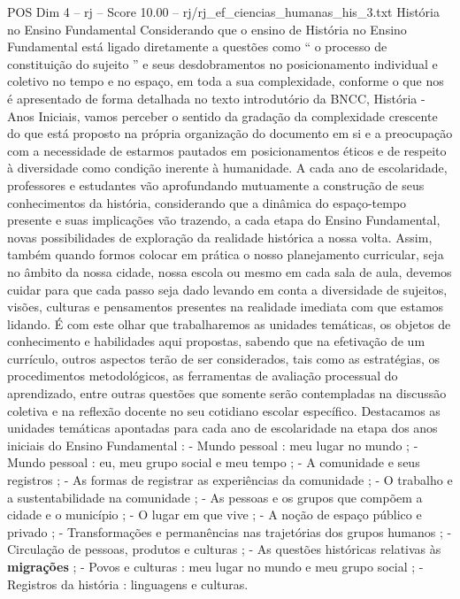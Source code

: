 \begin{textsample}{POS Dim 4 – rj – Score 10.00 – rj/rj\_ef\_ciencias\_humanas\_his\_3.txt}  \label{ex:f4_pos_162}
História no Ensino Fundamental Considerando que o ensino de História no Ensino Fundamental está ligado diretamente a questões como “ o processo de constituição do sujeito ” e seus desdobramentos no posicionamento individual e coletivo no tempo e no espaço, em toda a sua complexidade, conforme o que nos é apresentado de forma detalhada no texto introdutório da BNCC, História - Anos Iniciais, vamos perceber o sentido da gradação da complexidade crescente do que está proposto na própria organização do documento em si e a preocupação com a necessidade de estarmos pautados em posicionamentos éticos e de respeito à diversidade como condição inerente à humanidade.
A cada ano de escolaridade, professores e estudantes vão aprofundando mutuamente a construção de seus conhecimentos da história, considerando que a dinâmica do espaço-tempo presente e suas implicações vão trazendo, a cada etapa do Ensino Fundamental, novas possibilidades de exploração da realidade histórica a nossa volta.
Assim, também quando formos colocar em prática o nosso planejamento curricular, seja no âmbito da nossa cidade, nossa escola ou mesmo em cada sala de aula, devemos cuidar para que cada passo seja dado levando em conta a diversidade de sujeitos, visões, culturas e pensamentos presentes na realidade imediata com que estamos lidando.
É com este olhar que trabalharemos as unidades temáticas, os objetos de conhecimento e habilidades aqui propostas, sabendo que na efetivação de um currículo, outros aspectos terão de ser considerados, tais como as estratégias, os procedimentos metodológicos, as ferramentas de avaliação processual do aprendizado, entre outras questões que somente serão contempladas na discussão coletiva e na reflexão docente no seu cotidiano escolar específico.
Destacamos as unidades temáticas apontadas para cada ano de escolaridade na etapa dos anos iniciais do Ensino Fundamental : - Mundo pessoal : meu lugar no mundo ; - Mundo pessoal : eu, meu grupo social e meu tempo ; - A comunidade e seus registros ; - As formas de registrar as experiências da comunidade ; - O trabalho e a sustentabilidade na comunidade ; - As pessoas e os grupos que compõem a cidade e o município ; - O lugar em que vive ; - A noção de espaço público e privado ; - Transformações e permanências nas trajetórias dos grupos humanos ; - Circulação de pessoas, produtos e culturas ; - As questões históricas relativas às \textbf{migrações} ; - Povos e culturas : meu lugar no mundo e meu grupo social ; - Registros da história : linguagens e culturas.

\end{textsample}
